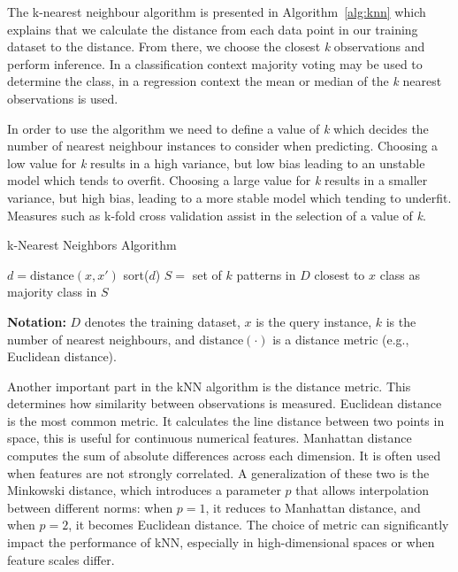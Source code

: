 \documentclass[10pt, conference]{IEEEtran}
\begin{document}
The k-nearest neighbour algorithm is presented in Algorithm~\ref{alg:knn} which explains that we calculate the distance from each data point in our training dataset to the distance. From there, we choose the closest \textit{k} observations and perform inference. In a classification context majority voting may be used to determine the class, in a regression context the mean or median of the \textit{k} nearest observations is used.

In order to use the algorithm we need to define a value of \textit{k} which decides the number of nearest neighbour instances to consider when predicting. Choosing a low value for \textit{k} results in a high variance, but low bias leading to an unstable model which tends to overfit. Choosing a large value for \textit{k} results in a smaller variance, but high bias, leading to a more stable model which tending to underfit. Measures such as k-fold cross validation assist in the selection of a value of \textit{k}.

\begin{algorithm}[htbp]
\caption{k-Nearest Neighbors Algorithm}
\label{alg:knn}
\begin{algorithmic}
\State $d = \text{distance}(x, x')$
\EndFor
\State sort($d$)
\State $S = $ set of $k$ patterns in $D$ closest to $x$
\State \Return class as majority class in $S$
\EndFunction
\end{algorithmic}
\end{algorithm}
\noindent
\textbf{Notation:} $D$ denotes the training dataset, $x$ is the query instance, $k$ is the number of nearest neighbours, and $\text{distance}(\cdot)$ is a distance metric (e.g., Euclidean distance).

Another important part in the kNN algorithm is the distance metric. This determines how similarity between observations is measured. Euclidean distance is the most common metric. It calculates the line distance between two points in space, this is useful for continuous numerical features. Manhattan distance computes the sum of absolute differences across each dimension. It is often used when features are not strongly correlated. A generalization of these two is the Minkowski distance, which introduces a parameter \(p\) that allows interpolation between different norms: when \(p = 1\), it reduces to Manhattan distance, and when \(p = 2\), it becomes Euclidean distance. The choice of metric can significantly impact the performance of kNN, especially in high-dimensional spaces or when feature scales differ.
\end{document}
